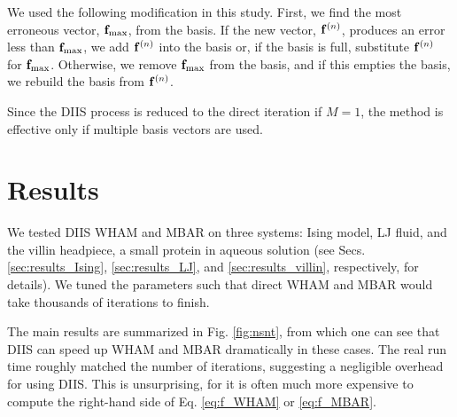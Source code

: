 \documentclass[reprint,aip,jcp,superscriptaddress]{revtex4-1}
\begin{document}
We used the following modification
in this study.
%
%
%
%
First, we find the most erroneous vector,
$\mathbf{f}_\mathrm{max}$, from the basis.
%
If the new vector, $\mathbf{f}^{(n)}$,
produces an error less than $\mathbf{f}_\mathrm{max}$,
we add $\mathbf{f}^{(n)}$ into the basis
or, if the basis is full,
substitute $\mathbf{f}^{(n)}$ for $\mathbf{f}_\mathrm{max}$.
%
Otherwise,
we remove $\mathbf{f}_\mathrm{max}$ from the basis,
and if this empties the basis,
we rebuild the basis from $\mathbf{f}^{(n)}$.



Since the DIIS process is reduced
to the direct iteration
if $M = 1$,
the method is effective
only if multiple basis vectors are used.
%




\section{Results}





We tested DIIS WHAM and MBAR on three systems:
Ising model, LJ fluid,
and the villin headpiece, a small protein in aqueous solution
(see Secs.
\ref{sec:results_Ising}, \ref{sec:results_LJ}, and
\ref{sec:results_villin},
respectively,
for details).
%
We tuned the parameters
such that direct WHAM and MBAR
would take thousands of iterations
to finish.



The main results
are summarized
in Fig. \ref{fig:nsnt},
from which one can see that
DIIS can speed up WHAM and MBAR
dramatically in these cases.
%
The real run time roughly matched
the number of iterations,
suggesting a negligible overhead for using DIIS.
%
This is unsurprising,
for it is often much more expensive to compute
the right-hand side of
Eq. \eqref{eq:f_WHAM} or \eqref{eq:f_MBAR}.
\end{document}
